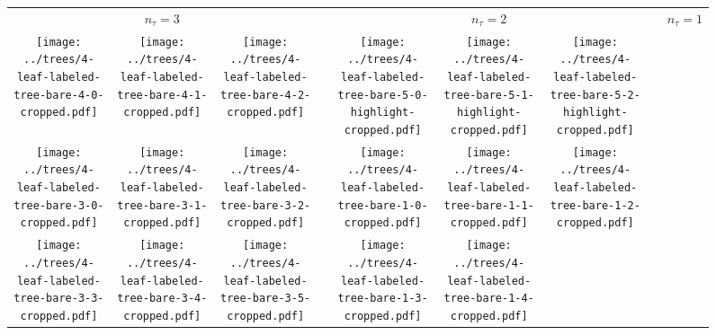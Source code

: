 \documentclass[border=10pt,varwidth=30cm]{standalone}
\newcommand{\ndivs}{\ensuremath{n_{\tau}}\xspace}
\newcommand{\pltwidth}{0.1}
\newcommand{\catspace}{0.1}
\begin{document}
\begin{figure}
    \setlength\arrayrulewidth{2pt}
    \centering
    \begin{tabular}{@{}ccccccccc@{}}
        \multicolumn{3}{c}{\Huge $\ndivs = 3$} & & \multicolumn{3}{c}{\Huge $\ndivs = 2$} & & {\Huge $\ndivs = 1$} \\[2.5ex]
        \texttt{[image: ../trees/4-leaf-labeled-tree-bare-4-0-cropped.pdf]}
        &
        \texttt{[image: ../trees/4-leaf-labeled-tree-bare-4-1-cropped.pdf]}
        &
        \texttt{[image: ../trees/4-leaf-labeled-tree-bare-4-2-cropped.pdf]}
        &
        \hspace{\catspace\textwidth}
        &
        \texttt{[image: ../trees/4-leaf-labeled-tree-bare-5-0-highlight-cropped.pdf]}
        &
        \texttt{[image: ../trees/4-leaf-labeled-tree-bare-5-1-highlight-cropped.pdf]}
        &
        \texttt{[image: ../trees/4-leaf-labeled-tree-bare-5-2-highlight-cropped.pdf]}
        &
        \hspace{\catspace\textwidth}
        &
        \\
        \texttt{[image: ../trees/4-leaf-labeled-tree-bare-3-0-cropped.pdf]}
        &
        \texttt{[image: ../trees/4-leaf-labeled-tree-bare-3-1-cropped.pdf]}
        &
        \texttt{[image: ../trees/4-leaf-labeled-tree-bare-3-2-cropped.pdf]}
        &
        &
        \texttt{[image: ../trees/4-leaf-labeled-tree-bare-1-0-cropped.pdf]}
        &
        \texttt{[image: ../trees/4-leaf-labeled-tree-bare-1-1-cropped.pdf]}
        &
        \texttt{[image: ../trees/4-leaf-labeled-tree-bare-1-2-cropped.pdf]}
        &
        &
        \\
        \texttt{[image: ../trees/4-leaf-labeled-tree-bare-3-3-cropped.pdf]}
        &
        \texttt{[image: ../trees/4-leaf-labeled-tree-bare-3-4-cropped.pdf]}
        &
        \texttt{[image: ../trees/4-leaf-labeled-tree-bare-3-5-cropped.pdf]}
        &
        &
        \texttt{[image: ../trees/4-leaf-labeled-tree-bare-1-3-cropped.pdf]}
        &
        \texttt{[image: ../trees/4-leaf-labeled-tree-bare-1-4-cropped.pdf]}
        &

\end{tabular}
\end{figure}
\end{document}
